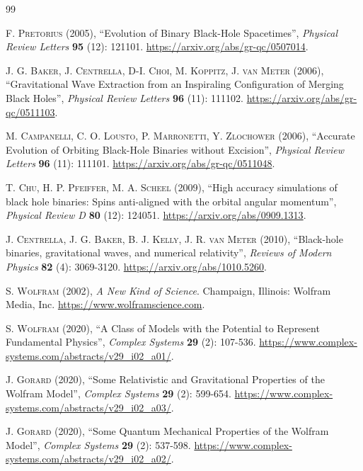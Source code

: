 \documentclass{article}
\begin{document}
\begin{thebibliography}{99}

\textsc{F. Pretorius} (2005), ``Evolution of Binary Black-Hole Spacetimes'', \textit{Physical Review Letters} \textbf{95} (12): 121101. \url{https://arxiv.org/abs/gr-qc/0507014}.

\textsc{J. G. Baker, J. Centrella, D-I. Choi, M. Koppitz, J. van Meter} (2006), ``Gravitational Wave Extraction from an Inspiraling Configuration of Merging Black Holes'', \textit{Physical Review Letters} \textbf{96} (11): 111102. \url{https://arxiv.org/abs/gr-qc/0511103}.

\textsc{M. Campanelli, C. O. Lousto, P. Marronetti, Y. Zlochower} (2006), ``Accurate Evolution of Orbiting Black-Hole Binaries without Excision'', \textit{Physical Review Letters} \textbf{96} (11): 111101. \url{https://arxiv.org/abs/gr-qc/0511048}.

\textsc{T. Chu, H. P. Pfeiffer, M. A. Scheel} (2009), ``High accuracy simulations of black hole binaries: Spins anti-aligned with the orbital angular momentum'', \textit{Physical Review D} \textbf{80} (12): 124051. \url{https://arxiv.org/abs/0909.1313}.

\textsc{J. Centrella, J. G. Baker, B. J. Kelly, J. R. van Meter} (2010), ``Black-hole binaries, gravitational waves, and numerical relativity'', \textit{Reviews of Modern Physics} \textbf{82} (4): 3069-3120. \url{https://arxiv.org/abs/1010.5260}.

\textsc{S. Wolfram} (2002), \textit{A New Kind of Science}. Champaign, Illinois: Wolfram Media, Inc. \url{https://www.wolframscience.com}.

\textsc{S. Wolfram} (2020), ``A Class of Models with the Potential to Represent Fundamental Physics'', \textit{Complex Systems} \textbf{29} (2): 107-536. \url{https://www.complex-systems.com/abstracts/v29_i02_a01/}.

\textsc{J. Gorard} (2020), ``Some Relativistic and Gravitational Properties of the Wolfram Model'', \textit{Complex Systems} \textbf{29} (2): 599-654. \url{https://www.complex-systems.com/abstracts/v29_i02_a03/}.

\textsc{J. Gorard} (2020), ``Some Quantum Mechanical Properties of the Wolfram Model'', \textit{Complex Systems} \textbf{29} (2): 537-598. \url{https://www.complex-systems.com/abstracts/v29_i02_a02/}.


\end{thebibliography}
\end{document}
